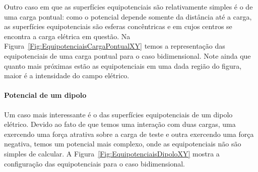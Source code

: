 Outro caso em que as superfícies equipotenciais são relativamente simples é o de uma carga pontual: como o potencial depende somente da distância até a carga, as superfícies equipotenciais são esferas concêntricas e em cujos centros se encontra a carga elétrica em questão. Na Figura~\ref{Fig:EquipotenciaisCargaPontualXY} temos a representação das equipotenciais de uma carga pontual para o caso bidimensional. Note ainda que quanto mais próximas estão as equipotenciais em uma dada região do figura, maior é a intensidade do campo elétrico.

\paragraph{Potencial de um dipolo}

Um caso mais interessante é o das superfícies equipotenciais de um dipolo elétrico. Devido ao fato de que temos uma interação com duas cargas, uma exercendo uma força atrativa sobre a carga de teste e outra exercendo uma força negativa, temos um potencial mais complexo, onde as equipotenciais não são simples de calcular. A Figura~\ref{Fig:EquipotenciaisDipoloXY} mostra a configuração das equipotenciais para o caso bidimensional.

